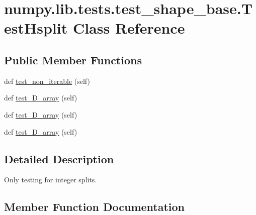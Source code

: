 \hypertarget{classnumpy_1_1lib_1_1tests_1_1test__shape__base_1_1TestHsplit}{}\section{numpy.\+lib.\+tests.\+test\+\_\+shape\+\_\+base.\+Test\+Hsplit Class Reference}
\label{classnumpy_1_1lib_1_1tests_1_1test__shape__base_1_1TestHsplit}
\subsection*{Public Member Functions}
\begin{DoxyCompactItemize}
\item 
def \hyperlink{classnumpy_1_1lib_1_1tests_1_1test__shape__base_1_1TestHsplit_a1bb06067628b5db64ac5d9c8147486f5}{test\+\_\+non\+\_\+iterable} (self)
\item 
def \hyperlink{classnumpy_1_1lib_1_1tests_1_1test__shape__base_1_1TestHsplit_a7dc2001638f3be79f727b39eec6b68fa}{test\+\_\+D\+\_\+array} (self)
\item 
def \hyperlink{classnumpy_1_1lib_1_1tests_1_1test__shape__base_1_1TestHsplit_aa35b0c32daab308b83bb8ccc562705b0}{test\+\_\+D\+\_\+array} (self)
\item 
def \hyperlink{classnumpy_1_1lib_1_1tests_1_1test__shape__base_1_1TestHsplit_afc463f564e02e2e04e8131311d9e4498}{test\+\_\+D\+\_\+array} (self)
\end{DoxyCompactItemize}


\subsection{Detailed Description}
\begin{DoxyVerb}Only testing for integer splits.\end{DoxyVerb}
 

\subsection{Member Function Documentation}
\mbox{\label{classnumpy_1_1lib_1_1tests_1_1test__shape__base_1_1TestHsplit_a7dc2001638f3be79f727b39eec6b68fa}} 
